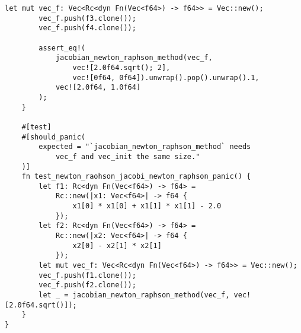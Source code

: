 \documentclass[uplatex, 11pt,a4j, titlepage]{jsarticle}
\begin{document}
\begin{lstlisting}[caption={newton\_raphson\_method.rs}]
        let mut vec_f: Vec<Rc<dyn Fn(Vec<f64>) -> f64>> = Vec::new();
        vec_f.push(f3.clone());
        vec_f.push(f4.clone());

        assert_eq!(
            jacobian_newton_raphson_method(vec_f, 
                vec![2.0f64.sqrt(); 2], 
                vec![0f64, 0f64]).unwrap().pop().unwrap().1,
            vec![2.0f64, 1.0f64]
        );
    }
    
    #[test]
    #[should_panic(
        expected = "`jacobian_newton_raphson_method` needs 
            vec_f and vec_init the same size."
    )]
    fn test_newton_raohson_jacobi_newton_raphson_panic() {
        let f1: Rc<dyn Fn(Vec<f64>) -> f64> =
            Rc::new(|x1: Vec<f64>| -> f64 { 
                x1[0] * x1[0] + x1[1] * x1[1] - 2.0 
            });
        let f2: Rc<dyn Fn(Vec<f64>) -> f64> =
            Rc::new(|x2: Vec<f64>| -> f64 { 
                x2[0] - x2[1] * x2[1] 
            });
        let mut vec_f: Vec<Rc<dyn Fn(Vec<f64>) -> f64>> = Vec::new();
        vec_f.push(f1.clone());
        vec_f.push(f2.clone());
        let _ = jacobian_newton_raphson_method(vec_f, vec![2.0f64.sqrt()]);
    }
}
\end{lstlisting}
\end{document}
